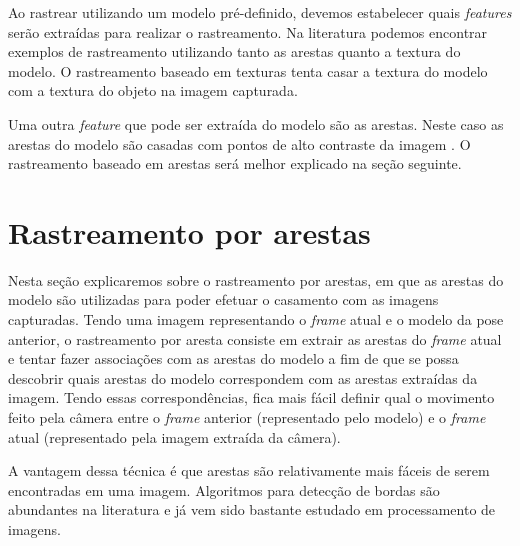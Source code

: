 Ao rastrear utilizando um modelo pré-definido, devemos estabelecer quais \emph{features} serão extraídas para realizar o rastreamento. Na literatura podemos encontrar exemplos de rastreamento utilizando tanto as arestas quanto a textura do modelo. O rastreamento baseado em texturas tenta casar a textura do modelo com a textura do objeto na imagem capturada.%


Uma outra \emph{feature} que pode ser extraída do modelo são as arestas. Neste caso as arestas do modelo são casadas com pontos de alto contraste da imagem \cite{drummondecipolla}. O rastreamento baseado em arestas será melhor explicado na seção seguinte.


\section{Rastreamento por arestas}

Nesta seção explicaremos sobre o rastreamento por arestas, em que as arestas do modelo são utilizadas para poder efetuar o casamento com as imagens capturadas. Tendo uma imagem representando o \emph{frame} atual e o modelo da pose anterior, o rastreamento por aresta consiste em extrair as arestas do \emph{frame} atual e tentar fazer associações com as arestas do modelo a fim de que se possa descobrir quais arestas do modelo correspondem com as arestas extraídas da imagem. Tendo essas correspondências, fica mais fácil definir qual o movimento feito pela câmera entre o \emph{frame} anterior (representado pelo modelo) e o \emph{frame} atual (representado pela imagem extraída da câmera).

A vantagem dessa técnica é que arestas são relativamente mais fáceis de serem encontradas em uma imagem. Algoritmos para detecção de bordas são abundantes na literatura e já vem sido bastante estudado em processamento de imagens.%

